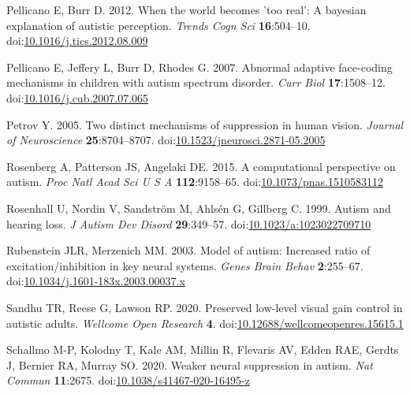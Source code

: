 \documentclass[
]{article}
\newlength{\cslhangindent}
\newlength{\cslentryspacingunit} %
\newenvironment{CSLReferences}[2] %
 {%
  \setlength{\parindent}{0pt}
  \ifodd #1
  \let\oldpar\par
  \def\par{\hangindent=\cslhangindent\oldpar}
  \fi
  \setlength{\parskip}{#2\cslentryspacingunit}
 }%
 {}
\begin{document}
\begin{CSLReferences}{1}{0}
\leavevmode{}%
Pellicano E, Burr D. 2012. When the world becomes 'too real': A bayesian explanation of autistic perception. \emph{Trends Cogn Sci} \textbf{16}:504--10. doi:\href{https://doi.org/10.1016/j.tics.2012.08.009}{10.1016/j.tics.2012.08.009}

\leavevmode{}%
Pellicano E, Jeffery L, Burr D, Rhodes G. 2007. Abnormal adaptive face-coding mechanisms in children with autism spectrum disorder. \emph{Curr Biol} \textbf{17}:1508--12. doi:\href{https://doi.org/10.1016/j.cub.2007.07.065}{10.1016/j.cub.2007.07.065}

\leavevmode{}%
Petrov Y. 2005. Two distinct mechanisms of suppression in human vision. \emph{Journal of Neuroscience} \textbf{25}:8704--8707. doi:\href{https://doi.org/10.1523/jneurosci.2871-05.2005}{10.1523/jneurosci.2871-05.2005}

\leavevmode{}%
Rosenberg A, Patterson JS, Angelaki DE. 2015. A computational perspective on autism. \emph{Proc Natl Acad Sci U S A} \textbf{112}:9158--65. doi:\href{https://doi.org/10.1073/pnas.1510583112}{10.1073/pnas.1510583112}

\leavevmode{}%
Rosenhall U, Nordin V, Sandström M, Ahlsén G, Gillberg C. 1999. Autism and hearing loss. \emph{J Autism Dev Disord} \textbf{29}:349--57. doi:\href{https://doi.org/10.1023/a:1023022709710}{10.1023/a:1023022709710}

\leavevmode{}%
Rubenstein JLR, Merzenich MM. 2003. Model of autism: Increased ratio of excitation/inhibition in key neural systems. \emph{Genes Brain Behav} \textbf{2}:255--67. doi:\href{https://doi.org/10.1034/j.1601-183x.2003.00037.x}{10.1034/j.1601-183x.2003.00037.x}

\leavevmode{}%
Sandhu TR, Reese G, Lawson RP. 2020. Preserved low-level visual gain control in autistic adults. \emph{Wellcome Open Research} \textbf{4}. doi:\href{https://doi.org/10.12688/wellcomeopenres.15615.1}{10.12688/wellcomeopenres.15615.1}

\leavevmode{}%
Schallmo M-P, Kolodny T, Kale AM, Millin R, Flevaris AV, Edden RAE, Gerdts J, Bernier RA, Murray SO. 2020. Weaker neural suppression in autism. \emph{Nat Commun} \textbf{11}:2675. doi:\href{https://doi.org/10.1038/s41467-020-16495-z}{10.1038/s41467-020-16495-z}


\end{CSLReferences}
\end{document}
